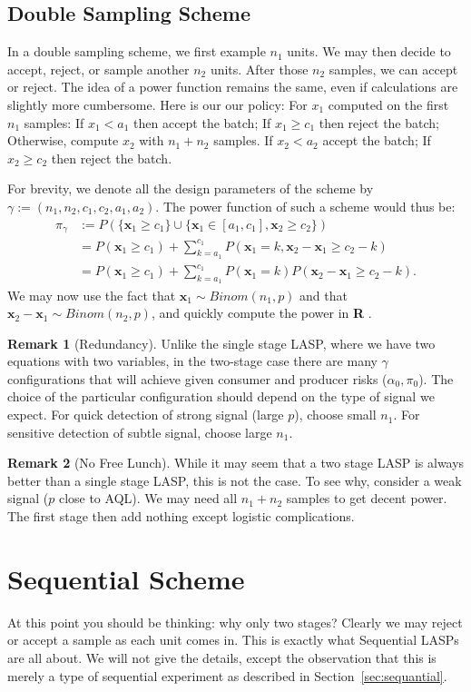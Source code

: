 \documentclass[12pt,a4paper]{report}
\theoremstyle{plain}
\theoremstyle{definition}
\newtheorem{remark}{Remark}
\newcommand{\set}[1]{\{ #1 \}} \newcommand{\setII}[1]{\left\{ #1 \right\}} \newcommand{\rv}[1]{\mathbf{#1}} \newcommand{\x}{\rv x} \newcommand{\y}{\rv y} \newcommand{\U}{\rv u} \newcommand{\T}{\rv t} \newcommand{\X}{\rv X} \newcommand{\Y}{\rv Y} \newcommand{\expect}[1]{\mathbf{E}\left[ #1 \right]} \newcommand{\expectg}[2]{\mathbf{E}_{\rv{#1}}\left[ \rv{#2} \right]} \newcommand{\expectn}[1]{\mathbb{E}\left[#1\right]} \newcommand{\cov}[1]{\mathbf{Cov} \left[ #1 \right]} \newcommand{\var}[1]{\mathop{Var} \left[ #1 \right]} \newcommand{\covn}[1]{\mathbb{Cov} \left[ #1 \right]} \newcommand{\gauss}[1]{\mathcal{N}\left(#1\right)} \newcommand{\cdf}[2]{F_{#1} (#2)} \newcommand{\survive}[2]{S_{#1} (#2)} \newcommand{\hazard}[2]{h_{#1} (#2)} \newcommand{\cuhazard}[2]{H_{#1} (#2)} \newcommand{\cdfn}[2]{\mathbb{F}_{#1}(#2)} \newcommand{\icdf}[2]{F_\rv{#1}^{-1} (#2)} \newcommand{\icdfn}[2]{\mathbb{F}^{-1}_{#1}(#2)} \newcommand{\pdf}[2]{p_{#1} (#2)} \newcommand{\prob}[1]{P\left( #1 \right)} \newcommand{\dist}{P} \newcommand{\density}{p}
\newcommand{\union}{\cup}
\newcommand{\R}{\textnormal{\sffamily\bfseries R }}
\begin{document}
\subsection{Double Sampling Scheme}
In a double sampling scheme, we first example $n_1$ units. 
We may then decide to accept, reject, or sample another $n_2$ units. 
After those $n_2$ samples, we can accept or reject. 
The idea of a power function remains the same, even if calculations are slightly more cumbersome.
Here is our our policy:
For $x_1$ computed on the first $n_1$ samples:
If $x_1  < a_1$ then accept the batch;
If $x_1 \geq  c_1$ then reject the batch;
Otherwise, compute $x_2$ with $n_1+n_2$ samples.
If $x_2 < a_2$ accept the batch;
If $x_2 \geq c_2$ then reject the batch.

For brevity, we denote all the design parameters of the scheme by $\gamma:= (n_1,n_2,c_1,c_2,a_1,a_2)$. 
The power function of such a scheme would thus be:
\begin{align}
	\pi_\gamma &:= P(\set{\x_1 \geq c_1} \union \set{\x_1 \in [a_1,c_1], \x_2 \geq c_2}) \\
	&= P(\x_1 \geq c_1) + \sum_{k=a_1}^{c_1} P(\x_1 =k, \x_2-\x_1 \geq c_2-k) \\
		&= P(\x_1 \geq c_1) + \sum_{k=a_1}^{c_1} P(\x_1 =k) P(\x_2-\x_1 \geq c_2-k).
\end{align}
We may now use the fact that $\x_1 \sim Binom(n_1,p)$ and that $\x_2-\x_1 \sim Binom(n_2,p)$, and quickly compute the power in \R.

\begin{remark}[Redundancy]
Unlike the single stage LASP, where we have two equations with two variables, in the two-stage case there are many $\gamma$ configurations that will achieve given consumer and producer risks ($\alpha_0,\pi_0$).
The choice of the particular configuration should depend on the type of signal we expect. 
For quick detection of strong signal (large $p$), choose small $n_1$. 
For sensitive detection of subtle signal, choose large $n_1$. 
\end{remark}

\begin{remark}[No Free Lunch]
While it may seem that a two stage LASP is always better than a single stage LASP, this is not the case.
To see why, consider a weak signal ($p$ close to AQL). We may need all $n_1+n_2$ samples to get decent power. The first stage then add nothing except logistic complications.
\end{remark}


\section{Sequential Scheme}
At this point you should be thinking: why only two stages? 
Clearly we may reject or accept a sample as each unit comes in.
This is exactly what Sequential LASPs are all about.
We will not give the details, except the observation that this is merely a type of sequential experiment as described in Section~\ref{sec:sequantial}.
\end{document}
